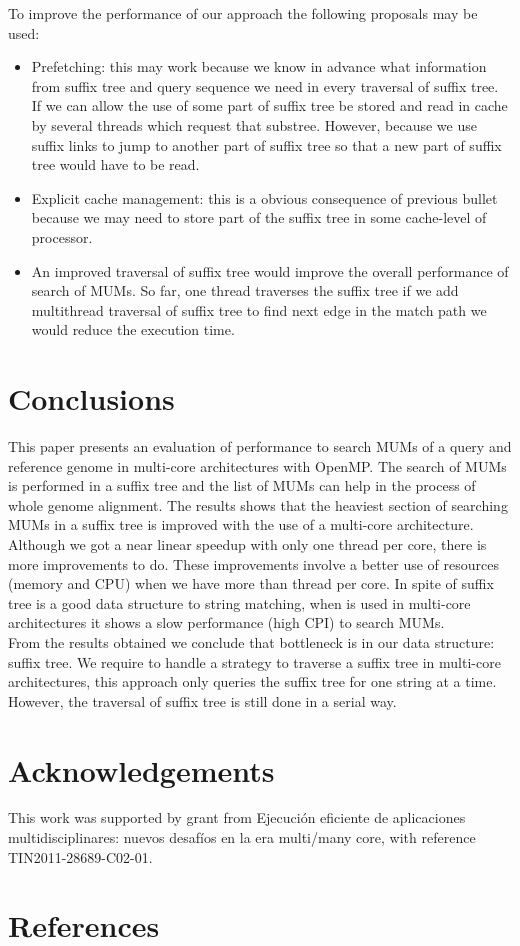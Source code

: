 \documentclass[3p,times]{elsarticle}
\begin{document}
 To improve the performance of our approach the following proposals may be used:
\begin{itemize}
  \item Prefetching: this may work because we know in advance what information from suffix tree and query sequence we need in every traversal of suffix tree. If we can allow the use of some part of suffix tree be stored and read in cache by several threads which request that substree. However, because we use suffix links to jump to another part of suffix tree so that a new part of suffix tree would have to be read.
  \item Explicit cache management: this is a obvious consequence of previous bullet because we may need to store part of the suffix tree in some cache-level of processor.
  \item An improved traversal of suffix tree would improve the overall performance of search of MUMs. So far, one thread traverses the suffix tree if we add multithread traversal of suffix tree to find next edge in the match path we would reduce the execution time.
\end{itemize}

\section{Conclusions}
This paper presents an evaluation of performance to search MUMs of a query and reference genome in multi-core architectures with OpenMP. The search of MUMs is performed in a suffix tree and the list of MUMs can help in the process of whole genome alignment. The results shows that the heaviest section of searching MUMs in a suffix tree is improved with the use of a multi-core architecture. Although we got a near linear speedup with only one thread per core, there is more improvements to do. These improvements involve a better use of resources (memory and CPU) when we have more than thread per core. In spite of suffix tree is a good data structure to string matching, when is used in multi-core architectures it shows a slow performance (high CPI) to search MUMs.\\
From the results obtained we conclude that bottleneck is in our data structure: suffix tree. We require to handle a strategy to traverse a suffix tree in multi-core architectures, this approach only queries the suffix tree for one string at a time. However, the traversal of suffix tree is still done in a serial way.

\section*{Acknowledgements}
This work was supported by grant from Ejecuci\'on eficiente de aplicaciones multidisciplinares: nuevos desaf\'ios en la era multi/many core, with reference TIN2011-28689-C02-01.

\section*{References}


\end{document}
